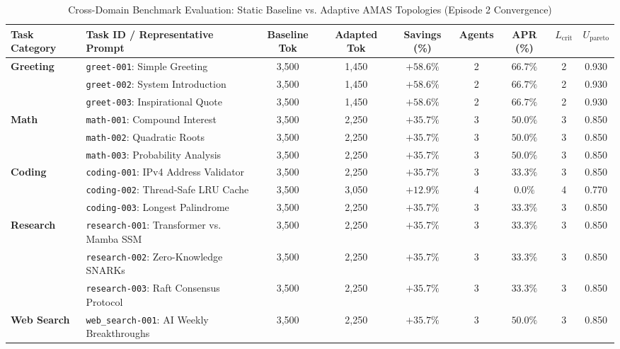 \begin{table}[t]
\centering
\caption{Cross-Domain Benchmark Evaluation: Static Baseline vs. Adaptive AMAS Topologies (Episode 2 Convergence)}
\label{tab:benchmark_convergence}
\begin{tabular}{l l c c c c c c c}
\toprule
\textbf{Task Category} & \textbf{Task ID / Representative Prompt} & \textbf{Baseline Tok} & \textbf{Adapted Tok} & \textbf{Savings (\%)} & \textbf{Agents} & \textbf{APR (\%)} & \textbf{$L_{\text{crit}}$} & \textbf{$U_{\text{pareto}}$} \\
\midrule
\textbf{Greeting} & \texttt{greet-001}: Simple Greeting & 3,500 & 1,450 & $+58.6\%$ & 2 & $66.7\%$ & 2 & 0.930 \\
 & \texttt{greet-002}: System Introduction & 3,500 & 1,450 & $+58.6\%$ & 2 & $66.7\%$ & 2 & 0.930 \\
 & \texttt{greet-003}: Inspirational Quote & 3,500 & 1,450 & $+58.6\%$ & 2 & $66.7\%$ & 2 & 0.930 \\
\textbf{Math} & \texttt{math-001}: Compound Interest & 3,500 & 2,250 & $+35.7\%$ & 3 & $50.0\%$ & 3 & 0.850 \\
 & \texttt{math-002}: Quadratic Roots & 3,500 & 2,250 & $+35.7\%$ & 3 & $50.0\%$ & 3 & 0.850 \\
 & \texttt{math-003}: Probability Analysis & 3,500 & 2,250 & $+35.7\%$ & 3 & $50.0\%$ & 3 & 0.850 \\
\textbf{Coding} & \texttt{coding-001}: IPv4 Address Validator & 3,500 & 2,250 & $+35.7\%$ & 3 & $33.3\%$ & 3 & 0.850 \\
 & \texttt{coding-002}: Thread-Safe LRU Cache & 3,500 & 3,050 & $+12.9\%$ & 4 & $0.0\%$ & 4 & 0.770 \\
 & \texttt{coding-003}: Longest Palindrome & 3,500 & 2,250 & $+35.7\%$ & 3 & $33.3\%$ & 3 & 0.850 \\
\textbf{Research} & \texttt{research-001}: Transformer vs. Mamba SSM & 3,500 & 2,250 & $+35.7\%$ & 3 & $33.3\%$ & 3 & 0.850 \\
 & \texttt{research-002}: Zero-Knowledge SNARKs & 3,500 & 2,250 & $+35.7\%$ & 3 & $33.3\%$ & 3 & 0.850 \\
 & \texttt{research-003}: Raft Consensus Protocol & 3,500 & 2,250 & $+35.7\%$ & 3 & $33.3\%$ & 3 & 0.850 \\
\textbf{Web Search} & \texttt{web\_search-001}: AI Weekly Breakthroughs & 3,500 & 2,250 & $+35.7\%$ & 3 & $50.0\%$ & 3 & 0.850 \\

\end{tabular}
\end{table}
